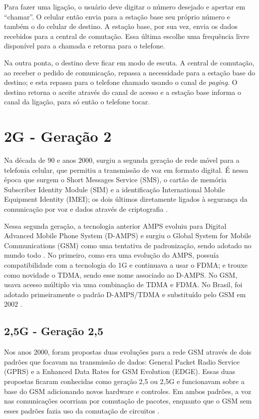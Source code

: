 \documentclass[11pt,oneside,a4paper]{abntex2}
\begin{document}
Para fazer uma ligação, o usuário deve digitar o número desejado e apertar em ``chamar''. O celular então envia para a estação base seu próprio número e também o do celular de destino. A estação base, por sua vez, envia os dados recebidos para a central de comutação. Essa última escolhe uma frequência livre disponível para a chamada e retorna para o telefone.

Na outra ponta, o destino deve ficar em modo de escuta. A central de comutação, ao receber o pedido de comunicação, repassa a necessidade para a estação base do destino; e esta repassa para o telefone chamado  usando o canal de \textit{paging}. O destino retorna o aceite através do canal de acesso e a estação base informa o canal da ligação, para só então o telefone tocar.

\section*{2G - Geração 2}
\label{2g}

Na década de 90 e anos 2000, surgiu a segunda geração de rede móvel para a telefonia celular, que permitiu a transmissão de voz em formato digital. É nessa época que surgem o Short Messages Service (SMS), o cartão de memória Subscriber Identity Module (SIM) e a identificação International Mobile Equipment Identity (IMEI); os dois últimos diretamente ligados à segurança da comunicação por voz e dados através de criptografia \cite{tcc2}.

Nessa segunda geração, a tecnologia anterior AMPS evoluiu para Digital Advanced Mobile Phone System (D-AMPS) e surgiu o Global System for Mobile Communications (GSM) como uma tentativa de padronização, sendo adotado no mundo todo \cite{aula3}. No primeiro, como era uma evolução do AMPS, possuía compatibilidade com a tecnologia do 1G e continuava a usar o FDMA; e trouxe como novidade o TDMA, sendo esse nome associado ao D-AMPS. No GSM, usava acesso múltiplo via uma combinação de TDMA e FDMA. No Brasil, foi adotado primeiramente o padrão D-AMPS/TDMA e substituído pelo GSM em 2002 \cite{tcc2}.

\subsection*{2,5G - Geração 2,5}

Nos anos 2000, foram propostas duas evoluções para a rede GSM através de dois padrões que focavam na transmissão de dados: General Packet Radio Service (GPRS) e a Enhanced Data Rates for GSM Evolution (EDGE). Essas duas propostas ficaram conhecidas como geração 2,5 ou 2,5G e funcionavam sobre a base do GSM adicionando novos hardware e controles. Em ambos padrões, a voz nas comunicações ocorriam por comutação de pacotes, enquanto que o GSM sem esses padrões fazia uso da comutação de circuitos \cite{tcc2}.
\end{document}
